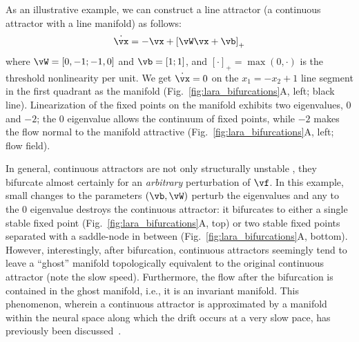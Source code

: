 \documentclass{article} %
\newcounter{ct}
\newcommand{\reals}{\mathbb{R}}
\theoremstyle{definition}
\theoremstyle{remark}
\begin{document}
As an illustrative example, we can construct a line attractor (a continuous attractor with a line manifold) as follows:
\begin{align}\label{eq:TLN}
    \dot{\vx} = -\vx + \left[ \vW \vx + \vb \right]_{+}
\end{align}where \(\vW = [0, -1; -1, 0]\) and \(\vb = [1; 1]\), and \([\cdot]_{+} = \max(0,\cdot)\) is the threshold nonlinearity per unit.
We get \(\dot{\vx} = 0\) on the \(x_{1} = -x_{2} + 1\) line segment in the first quadrant as the manifold (Fig.~\ref{fig:lara_bifurcations}A, left; black line).
Linearization of the fixed points on the manifold exhibits two eigenvalues, \(0\) and \(-2\);
the \(0\) eigenvalue allows the continuum of fixed points, while \(-2\) makes the flow normal to the manifold attractive (Fig.~\ref{fig:lara_bifurcations}A, left; flow field).

In general, continuous attractors are not only structurally unstable \citep{mane1987proof}, they bifurcate almost certainly for an \emph{arbitrary} perturbation of $\vf$.
In this example, small changes to the parameters \((\vb,\vW)\) perturb the eigenvalues and any to the \(0\) eigenvalue destroys the continuous attractor: it bifurcates to either
a single stable fixed point (Fig.~\ref{fig:lara_bifurcations}A, top) or two stable fixed points separated with a saddle-node in between (Fig.~\ref{fig:lara_bifurcations}A, bottom).
However, interestingly, after bifurcation, continuous attractors seemingly tend to leave a ``ghost'' manifold topologically equivalent to the original continuous attractor (note the slow speed).
Furthermore, the flow after the bifurcation is contained in the ghost manifold, i.e., it is an invariant manifold.
This phenomenon, wherein a continuous attractor is approximated by a manifold within the neural space along which the drift occurs at a very slow pace, has previously been discussed~\citep{seung1997learning,mante2013context,schmidt2019identifying}.
\end{document}
